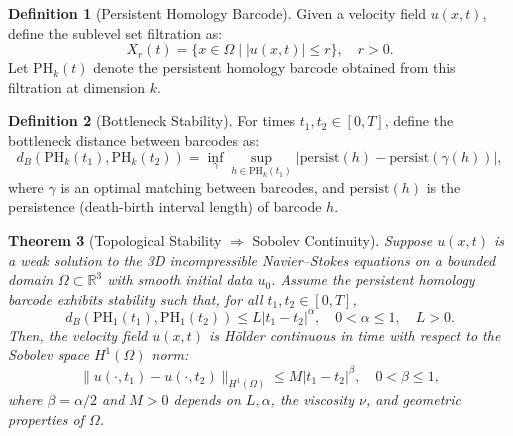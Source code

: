 \documentclass[11pt]{article}
\newtheorem{theorem}{Theorem}[section]
\theoremstyle{definition}
\newtheorem{definition}[theorem]{Definition}
\begin{document}
\begin{definition}[Persistent Homology Barcode]
Given a velocity field $u(x,t)$, define the sublevel set filtration as:
\[
X_r(t) = \{x \in \Omega \mid |u(x,t)| \leq r \}, \quad r > 0.
\]
Let $\mathrm{PH}_k(t)$ denote the persistent homology barcode obtained from this filtration at dimension $k$.
\end{definition}

\begin{definition}[Bottleneck Stability]
For times $t_1, t_2 \in [0,T]$, define the bottleneck distance between barcodes as:
\[
d_B(\mathrm{PH}_k(t_1), \mathrm{PH}_k(t_2)) = \inf_{\gamma} \sup_{h \in \mathrm{PH}_k(t_1)}|\mathrm{persist}(h)-\mathrm{persist}(\gamma(h))|,
\]
where $\gamma$ is an optimal matching between barcodes, and $\mathrm{persist}(h)$ is the persistence (death-birth interval length) of barcode $h$.
\end{definition}

\begin{theorem}[Topological Stability $\Rightarrow$ Sobolev Continuity]
\label{thm:topological_sobolev_continuity}
Suppose $u(x,t)$ is a weak solution to the 3D incompressible Navier--Stokes equations on a bounded domain $\Omega \subset \mathbb{R}^3$ with smooth initial data $u_0$. Assume the persistent homology barcode exhibits stability such that, for all $t_1,t_2\in[0,T]$,
\[
d_B(\mathrm{PH}_1(t_1), \mathrm{PH}_1(t_2)) \leq L|t_1-t_2|^{\alpha}, \quad 0 < \alpha \leq 1, \quad L > 0.
\]
Then, the velocity field $u(x,t)$ is H\"older continuous in time with respect to the Sobolev space $H^1(\Omega)$ norm:
\[
\|u(\cdot,t_1)-u(\cdot,t_2)\|_{H^1(\Omega)} \leq M|t_1-t_2|^{\beta}, \quad 0<\beta\leq 1,
\]
where $\beta = \alpha/2$ and $M > 0$ depends on $L, \alpha$, the viscosity $\nu$, and geometric properties of $\Omega$.
\end{theorem}
\end{document}
